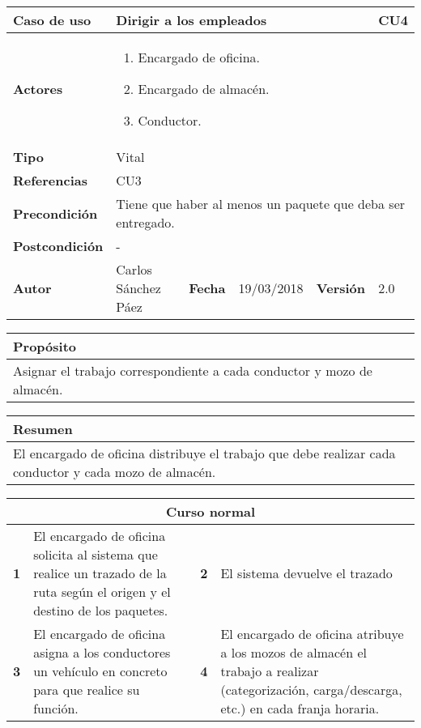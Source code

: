 \begin{table}[H]
\centering
\begin{tabular}{|m{3cm}|m{4cm}|m{2cm}|m{2cm}|m{2cm}|m{1cm}|}
\hline
\textbf{Caso de uso} &  \multicolumn{4}{m{8cm}|}{Dirigir a los empleados} \vline &  \cellcolor{gray!40}CU4 \\
\hline
\textbf{Actores} & \multicolumn{5}{m{8cm}|}{\begin{enumerate}
\item Encargado de oficina.
\item Encargado de almacén.
\item Conductor.
\end{enumerate}} \\
\hline
\textbf{Tipo} & \multicolumn{5}{m{8cm}|}{Vital} \\
\hline
\textbf{Referencias} &\multicolumn{5}{m{8cm}|}{CU3} \\
\hline
\textbf{Precondición} & \multicolumn{5}{m{8cm}|}{Tiene que haber al menos un paquete que deba ser entregado.} \\
\hline
\textbf{Postcondición} & \multicolumn{5}{m{8cm}|}{-} \\
\hline
\textbf{Autor} & Carlos Sánchez Páez & \textbf{Fecha} & 19/03/2018 & \textbf{Versión} & 2.0 \\
\hline
\end{tabular}

\vspace{1cm}

\begin{tabular}{|m{16.2cm}|}
\hline
\textbf{Propósito} \\
\hline
Asignar el trabajo correspondiente a cada conductor y mozo de almacén. \\
\hline
\end{tabular}

\vspace{1cm}

\begin{tabular}{|m{16.2cm}|}
\hline
\textbf{Resumen} \\
\hline
El encargado de oficina distribuye el trabajo que debe realizar cada conductor y cada mozo de almacén. \\
\hline
\end{tabular}

\vspace{1cm}

\begin{tabular}{|m{4pt}|m{7.33cm}|m{4pt}|m{7.33cm}|}
\hline
\multicolumn{4}{|c|}{\textbf{Curso normal}} \\
\hline
\textbf{1} & El encargado de oficina solicita al sistema que realice un trazado de la ruta según el origen y el destino de los paquetes. & \textbf{2} & El sistema devuelve el trazado \\
\hline
\textbf{3} & El encargado de oficina asigna a los conductores un vehículo en concreto para que realice su función. & \textbf{4} & El encargado de oficina atribuye a los mozos de almacén el trabajo a realizar (categorización, carga/descarga, etc.) en cada franja horaria. \\
\hline
\end{tabular}


\end{table}
